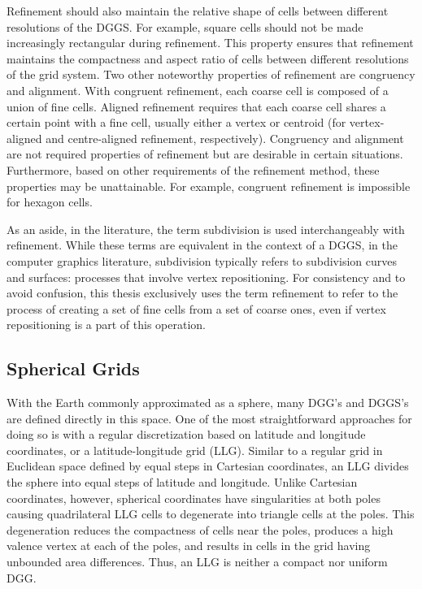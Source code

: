 Refinement should also maintain the relative shape of cells between different resolutions of the DGGS.
For example, square cells should not be made increasingly rectangular during refinement.
This property ensures that refinement maintains the compactness and aspect ratio of cells between different resolutions of the grid system.
Two other noteworthy properties of refinement are congruency and alignment.
With congruent refinement, each coarse cell is composed of a union of fine cells.
Aligned refinement requires that each coarse cell shares a certain point with a fine cell, usually either a vertex or centroid (for vertex-aligned and centre-aligned refinement, respectively).
Congruency and alignment are not required properties of refinement but are desirable in certain situations.
Furthermore, based on other requirements of the refinement method, these properties may be unattainable. For example, congruent refinement is impossible for hexagon cells.


As an aside, in the literature, the term subdivision is used interchangeably with refinement.
While these terms are equivalent in the context of a DGGS, in the computer graphics literature, subdivision typically refers to subdivision curves and surfaces: processes that involve vertex repositioning.
For consistency and to avoid confusion, this thesis exclusively uses the term refinement to refer to the process of creating a set of fine cells from a set of coarse ones, even if vertex repositioning is a part of this operation.


\subsection{Spherical Grids} \label{chap:2:spherical}
With the Earth commonly approximated as a sphere, many DGG's and DGGS's are defined directly in this space.
One of the most straightforward approaches for doing so is with a regular discretization based on latitude and longitude coordinates, or a latitude-longitude grid (LLG).
Similar to a regular grid in Euclidean space defined by equal steps in Cartesian coordinates, an LLG divides the sphere into equal steps of latitude and longitude.
Unlike Cartesian coordinates, however, spherical coordinates have singularities at both poles causing quadrilateral LLG cells to degenerate into triangle cells at the poles.
This degeneration reduces the compactness of cells near the poles, produces a high valence vertex at each of the poles, and results in cells in the grid having unbounded area differences.
Thus, an LLG is neither a compact nor uniform DGG.


